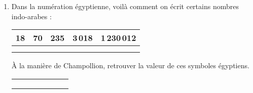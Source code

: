       \begin{enumerate}
         \item Dans la numération égyptienne, voilà comment on écrit certains nombres indo-arabes : \smallskip
         \begin{center} 
            \begin{tabular}{|c|c|c|c|c|}
               \hline
               18 & 70 & 235 & 3\,018 & 1\,230\,012 \\
               \hline
               & & & & \\ [-3mm]
               \Large\textpmhg{\Hten\Hone\Hone\Hone\Hone\Hone\Hone\Hone\Hone}
               &
               \Large\textpmhg{\Hten\Hten\Hten\Hten\Hten\Hten\Hten}
               & 
               \Large\textpmhg{\Hhundred\Hhundred\Hten\Hten\Hten\Hone\Hone\Hone\Hone\Hone} & \Large\textpmhg{\Hthousand\Hthousand\Hthousand\Hten\Hone\Hone\Hone\Hone\Hone\Hone\Hone\Hone}
               &
               \Large\textpmhg{\Hmillion\HCthousand\HCthousand\HXthousand\HXthousand\HXthousand\Hten\Hone\Hone} \\
               \hline
            \end{tabular}
         \end{center} \medskip
      À la manière de Champollion, retrouver la valeur de ces symboles égyptiens. \smallskip
      \begin{center}
         \begin{tabular}{|C{1.8}|C{1.8}|C{1.8}|C{1.8}|C{1.8}|C{1.8}|C{1.8}|}
            \hline
            & & & & & & \\ [-3mm]
            \Large\textpmhg{\Hone}
            &
            \Large\textpmhg{\Hten}
            &
            \Large\textpmhg{\Hhundred}
            &
            \Large\textpmhg{\Hthousand}
            &
            \Large\textpmhg{\HXthousand}
            &
            \Large\textpmhg{\HCthousand}
            &
            \Large\textpmhg{\Hmillion} \\
            \hline
            & & & & & & \\ [3mm]
           \hline
         \end{tabular}
      \end{center}
 
      \bigskip
   

\end{enumerate}
